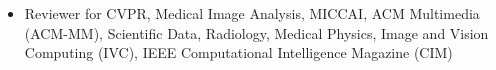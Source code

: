 

\begin{cvparagraph}
\begin{itemize}
	\item Reviewer for CVPR, Medical Image Analysis, MICCAI, ACM Multimedia (ACM-MM),  Scientific Data, Radiology, Medical Physics, Image and Vision Computing (IVC), IEEE Computational Intelligence Magazine (CIM)
\end{itemize}



\end{cvparagraph}
